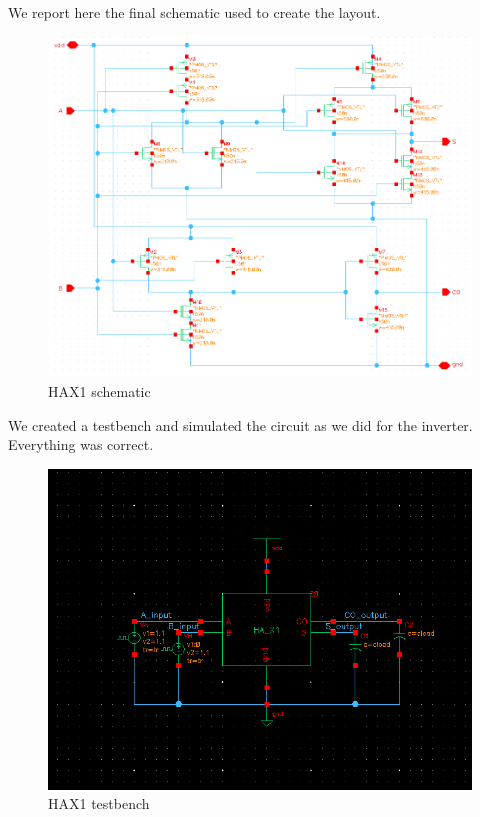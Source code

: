 \documentclass[a4paper]{article}
\begin{document}
We report here the final schematic used to create the layout.

\begin{figure}[H]
      \centering
       \includegraphics[width=\linewidth]{./Images/HA/HAX1_schematic.png}
\caption{HAX1 schematic}
\label{fig: HAX1_sch}
\end{figure}

We created a testbench and simulated the circuit as we did for the inverter. Everything was correct.

\begin{figure}[H]
      \centering
       \includegraphics[width=12cm]{./Images/HA/HAX1_TB_schematic.png}
\caption{HAX1 testbench}
\label{fig: HAX1_tb}
\end{figure}
\end{document}
